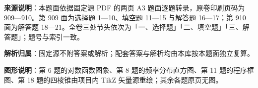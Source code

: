 

\begin{gknotice}
\textbf{来源说明}：本题面依据固定源 PDF 的两页 A3 题面逐题转录，原卷印刷页码为 909—910。第 909 面为选择题 1—10、填空题 11—15 与解答题 16—17；第 910 面为解答题 18—21。全卷三处节头依次为「一、选择题」「二、填空题」「三、解答题」；题号与索引一致。

\textbf{解析归属}：固定源不附答案或解析；配套答案与解析均由本库按本题面独立复算。

\textbf{图形说明}：第 6 题的对数函数图象、第 8 题的频率分布直方图、第 11 题的程序框图、第 18 题的四棱锥由项目内 TikZ 矢量源重绘；其余各题原页无图。
\end{gknotice}


